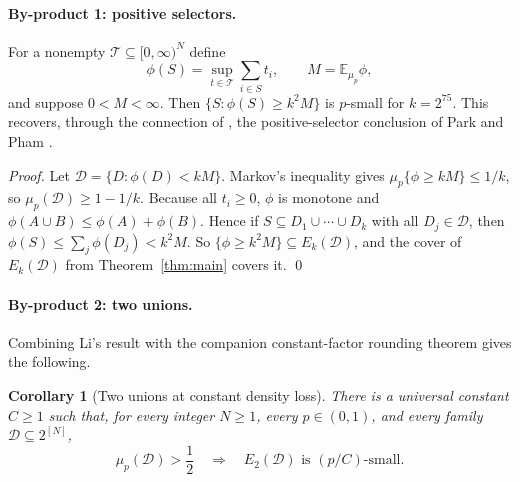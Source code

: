 \documentclass[11pt,letterpaper]{article}
\newtheorem{corollary}[theorem]{Corollary}
\theoremstyle{definition}
\theoremstyle{remark}
\numberwithin{equation}{section}
\begin{document}
\paragraph{By-product 1: positive selectors.}
For a nonempty $\mathcal T\subseteq[0,\infty)^N$ define
\[
\phi(S)=\sup_{t\in\mathcal T}\sum_{i\in S}t_i,
\qquad M=\mathbb E_{\mu_p}\phi,
\]
and suppose $0<M<\infty$. Then $\{S:\phi(S)\ge k^2M\}$ is $p$-small for $k=2^{75}$. This recovers, through the connection of \cite[Section~7]{Talagrand10}, the positive-selector conclusion of Park and Pham \cite[Theorem~1.2]{ParkPham24}.

\emph{Proof.} Let $\mathcal D=\{D:\phi(D)<kM\}$. Markov's inequality gives $\mu_p\{\phi\ge kM\}\le1/k$, so $\mu_p(\mathcal D)\ge1-1/k$. Because all $t_i\ge0$, $\phi$ is monotone and $\phi(A\cup B)\le\phi(A)+\phi(B)$. Hence if $S\subseteq D_1\cup\cdots\cup D_k$ with all $D_j\in\mathcal D$, then $\phi(S)\le\sum_j\phi(D_j)<k^2M$. So $\{\phi\ge k^2M\}\subseteq E_k(\mathcal D)$, and the cover of $E_k(\mathcal D)$ from Theorem~\ref{thm:main} covers it. \qed

\paragraph{By-product 2: two unions.}
Combining Li's result with the companion constant-factor rounding theorem gives the following.

\begin{corollary}[Two unions at constant density loss]
\label{cor:two-union}
There is a universal constant $C\ge1$ such that, for every integer $N\ge1$,
every $p\in(0,1)$, and every family $\mathcal D\subseteq2^{[N]}$,
\[
\mu_p(\mathcal D)>\frac12
\quad\Longrightarrow\quad
E_2(\mathcal D)\text{ is }(p/C)\text{-small}.
\]
\end{corollary}
\end{document}
